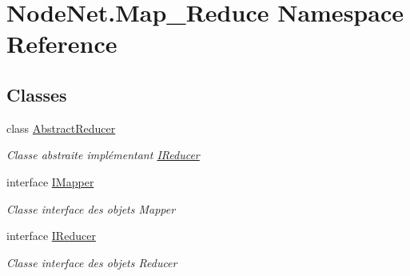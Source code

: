 \hypertarget{namespace_node_net_1_1_map___reduce}{}\section{Node\+Net.\+Map\+\_\+\+Reduce Namespace Reference}
\label{namespace_node_net_1_1_map___reduce}
\subsection*{Classes}
\begin{DoxyCompactItemize}
\item 
class \hyperlink{class_node_net_1_1_map___reduce_1_1_abstract_reducer}{Abstract\+Reducer}
\begin{DoxyCompactList}\small\item\em Classe abstraite implémentant \hyperlink{interface_node_net_1_1_map___reduce_1_1_i_reducer}{I\+Reducer} \end{DoxyCompactList}\item 
interface \hyperlink{interface_node_net_1_1_map___reduce_1_1_i_mapper}{I\+Mapper}
\begin{DoxyCompactList}\small\item\em Classe interface des objets Mapper \end{DoxyCompactList}\item 
interface \hyperlink{interface_node_net_1_1_map___reduce_1_1_i_reducer}{I\+Reducer}
\begin{DoxyCompactList}\small\item\em Classe interface des objets Reducer \end{DoxyCompactList}\end{DoxyCompactItemize}
